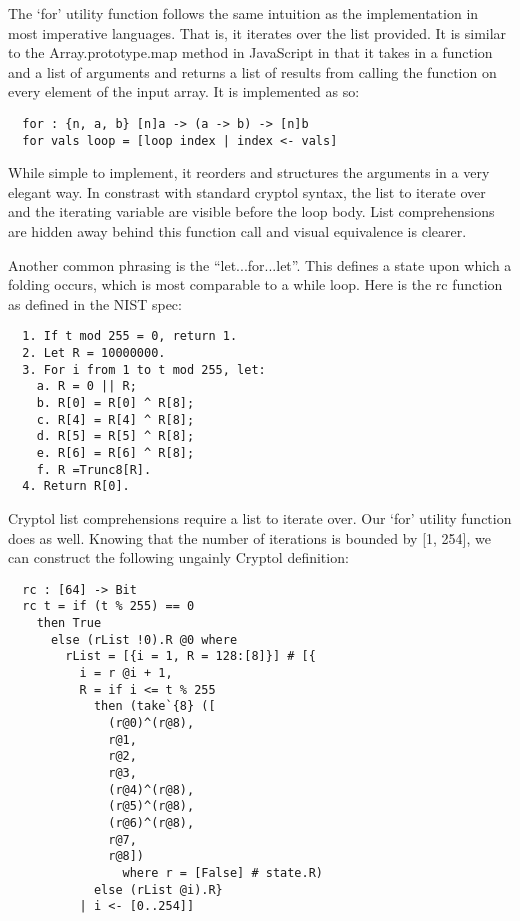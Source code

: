   The ‘for’ utility function follows the same intuition as the implementation in most 
  imperative languages. That is, it iterates over the list provided. It is similar to the 
  Array.prototype.map method in JavaScript in that it takes in a function and a list of 
  arguments and returns a list of results from calling the function on every element of the 
  input array. It is implemented as so:

\begin{verbatim}
  for : {n, a, b} [n]a -> (a -> b) -> [n]b
  for vals loop = [loop index | index <- vals]
\end{verbatim}

While simple to implement, it reorders and structures the arguments in a very elegant way.
In constrast with standard cryptol syntax, the list to iterate over and the iterating 
variable are visible before the loop body. List comprehensions are hidden away behind this 
function call and visual equivalence is clearer.

Another common phrasing is the “let...for...let”. This defines a state upon which a folding 
occurs, which is most comparable to a while loop. Here is the rc function as defined in the 
NIST spec:

\begin{verbatim}
  1. If t mod 255 = 0, return 1.
  2. Let R = 10000000.
  3. For i from 1 to t mod 255, let:
    a. R = 0 || R;
    b. R[0] = R[0] ^ R[8];
    c. R[4] = R[4] ^ R[8];
    d. R[5] = R[5] ^ R[8];
    e. R[6] = R[6] ^ R[8];
    f. R =Trunc8[R].
  4. Return R[0].
\end{verbatim}

Cryptol list comprehensions require a list to iterate over. Our ‘for’ utility function does 
as well. Knowing that the number of iterations is bounded by [1, 254], we can construct the 
following ungainly Cryptol definition:

\begin{verbatim}
  rc : [64] -> Bit
  rc t = if (t % 255) == 0 
    then True 
      else (rList !0).R @0 where
        rList = [{i = 1, R = 128:[8]}] # [{
          i = r @i + 1, 
          R = if i <= t % 255
            then (take`{8} ([
              (r@0)^(r@8),
              r@1,
              r@2,
              r@3, 
              (r@4)^(r@8),
              (r@5)^(r@8),
              (r@6)^(r@8),
              r@7,
              r@8])
                where r = [False] # state.R)
            else (rList @i).R}
          | i <- [0..254]]
\end{verbatim}

